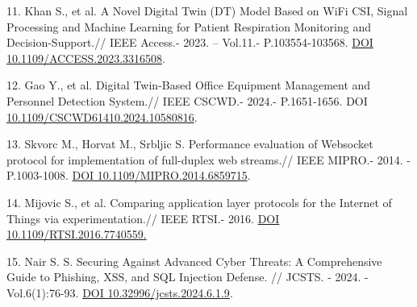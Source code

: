 \begin{refs}
11. Khan S., et al. A Novel Digital Twin (DT) Model Based on WiFi CSI,
Signal Processing and Machine Learning for Patient Respiration
Monitoring and Decision-Support.// IEEE Access.- 2023. -- Vol.11.-
P.103554-103568.
\href{https://www.google.com/search?q=https://doi.org/10.1109/ACCESS.2023.3316508}{DOI
10.1109/ACCESS.2023.3316508}.

12. Gao Y., et al. Digital Twin-Based Office Equipment Management and
Personnel Detection System.// IEEE CSCWD.- 2024.- P.1651-1656. DOI
\href{https://doi.org/10.1109/CSCWD61410.2024.10580816}{10.1109/CSCWD61410.2024.10580816}.

13. Skvorc M., Horvat M., Srbljic S. Performance evaluation of Websocket
protocol for implementation of full-duplex web streams.// IEEE MIPRO.-
2014. - P.1003-1008.
\href{https://doi.org/10.1109/MIPRO.2014.6859715}{DOI
10.1109/MIPRO.2014.6859715}.

14. Mijovic S., et al. Comparing application layer protocols for the
Internet of Things via experimentation.// IEEE RTSI.- 2016.
\href{https://www.google.com/search?q=https://doi.org/10.1109/RTSI.2016.7740582}{DOI
\href{https://doi.org/10.1109/RTSI.2016.7740559}{10.1109/RTSI.2016.7740559}.}

15. Nair S. S. Securing Against Advanced Cyber Threats: A Comprehensive
Guide to Phishing, XSS, and SQL Injection Defense. // JCSTS. - 2024. -
Vol.6(1):76-93. \href{https://doi.org/10.32996/jcsts.2024.6.1.9}{DOI
10.32996/jcsts.2024.6.1.9}.
\end{refs}

